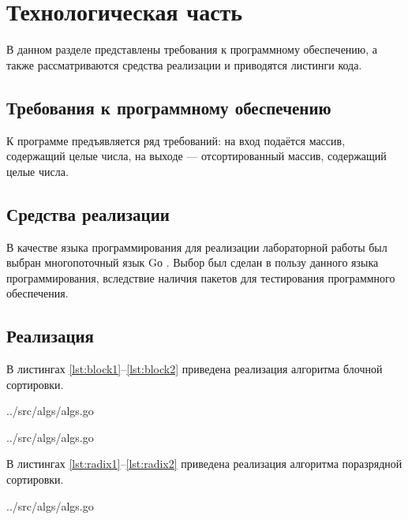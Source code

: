 \chapter{Технологическая часть}

В данном разделе представлены требования к программному обеспечению, а также рассматриваются средства реализации и приводятся листинги кода.

\section{Требования к программному обеспечению}

К программе предъявляется ряд требований: на вход подаётся массив, содержащий целые числа, на выходе --- отсортированный массив, содержащий целые числа.

\section{Средства реализации}

В качестве языка программирования для реализации лабораторной работы был выбран многопоточный язык Gо \cite{golang}. Выбор был сделан в пользу данного языка программирования, вследствие наличия пакетов для тестирования программного обеспечения.

\section{Реализация}

В листингах \ref{lst:block1}--\ref{lst:block2} приведена реализация алгоритма блочной сортировки.
\newpage

\begin{lstinputlisting}[
	caption={Алгоритм блочной сортировки},
	label={lst:block1},
	style={go},
	linerange={24-71},
	]{../src/algs/algs.go}
\end{lstinputlisting}

\begin{lstinputlisting}[
	caption={Продолжение листинга \ref{lst:block1}},
	label={lst:block2},
	style={go},
	linerange={72-83},
	]{../src/algs/algs.go}
\end{lstinputlisting}

В листингах \ref{lst:radix1}--\ref{lst:radix2} приведена реализация алгоритма поразрядной сортировки.

\begin{lstinputlisting}[
	caption={Алгоритм поразрядной сортировки},
	label={lst:radix1},
	style={go},
	linerange={85-113},
	]{../src/algs/algs.go}
\end{lstinputlisting}


